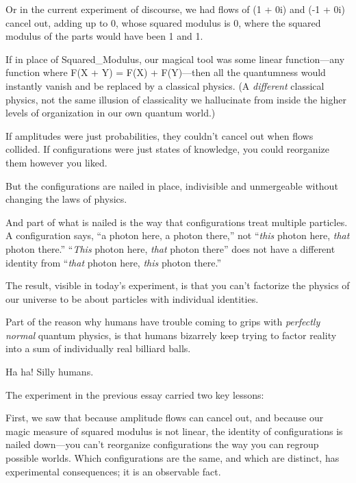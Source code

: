 \bigskip

{
 Or in the current experiment of discourse, we had flows of (1 +
0i) and (-1 + 0i) cancel out, adding up to 0, whose squared modulus is
0, where the squared modulus of the parts would have been 1 and 1.}

{
 If in place of Squared\_Modulus, our magical tool was some linear
function---any function where F(X + Y) = F(X) + F(Y)---then all the
quantumness would instantly vanish and be replaced by a classical
physics. (A \textit{different} classical physics, not the same illusion
of classicality we hallucinate from inside the higher levels of
organization in our own quantum world.)}

{
 If amplitudes were just probabilities, they
couldn't cancel out when flows collided. If
configurations were just states of knowledge, you could reorganize them
however you liked.}

{
 But the configurations are nailed in place, indivisible and
unmergeable without changing the laws of physics.}

{
 And part of what is nailed is the way that configurations treat
multiple particles. A configuration says, ``a photon
here, a photon there,'' not
``\textit{this} photon here, \textit{that} photon
there.'' ``\textit{This} photon
here, \textit{that} photon there'' does not have a
different identity from ``\textit{that} photon here,
\textit{this} photon there.''}

{
 The result, visible in today's experiment, is that
you can't factorize the physics of our universe to be
about particles with individual identities.}

{
 Part of the reason why humans have trouble coming to grips with
\textit{perfectly normal} quantum physics, is that humans bizarrely
keep trying to factor reality into a sum of individually real billiard
balls.}

{
 Ha ha! Silly humans.}

\myendsectiontext


{
 The experiment in the previous essay carried two key lessons: }

{
 First, we saw that because amplitude flows can cancel out, and
because our magic measure of squared modulus is not linear, the
identity of configurations is nailed down---you can't
reorganize configurations the way you can regroup possible worlds.
Which configurations are the same, and which are distinct, has
experimental consequences; it is an observable fact.}

